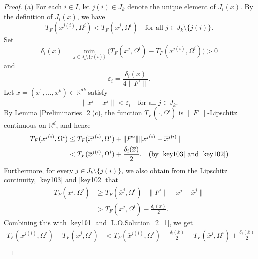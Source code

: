 \documentclass[sn-mathphys-num]{sn-jnl}%
\theoremstyle{definition}
\begin{document}
\begin{proof}
	(a) For each $i\in I$, let $j(i) \in J_k$ denote the unique element of $J_i(\overline{x})$. By the definition of $J_i(\overline{x})$, we have
	\begin{equation}\label{key101}
		T_F(\overline{x}^{j(i)},\Omega^i) < T_F(\overline{x}^j,\Omega^i) \quad \text{for all } j \in J_k\setminus\{j(i)\}.    
	\end{equation}
	Set
	\begin{equation*}
		\delta_i(\overline{x}) = \min_{j\in J_k \setminus \{j(i)\}} \bigl( T_F(\overline{x}^j,{\Omega^i}) - T_F(\overline{x}^{j(i)},\Omega^i) \bigr) > 0   
	\end{equation*}
	and
	\begin{equation}\label{key103}
		\varepsilon_i = \frac{\delta_i(\overline{x})}{4\|F^\circ\|}.
	\end{equation}
	Let $x=(x^1,\dots,x^k)\in \mathbb{R}^{dk}$ satisfy 
	\begin{equation}\label{key102}
		\|x^j-\overline{x}^j\|<\varepsilon_i\quad\text{for all }j \in J_k.
	\end{equation}
	By Lemma \ref{Preliminaries_2}(c), the function $T_F(\cdot,\Omega^i)$ is $\|F^\circ\|$-Lipschitz continuous on $\mathbb{R}^d$, and hence
	\begin{equation}
		\label{L.O.Solution_2_1}
		\begin{aligned}
			T_F(x^{j(i)},\Omega^i) &\le T_F(\overline{x}^{j(i)},\Omega^i) + \|F^\circ\|\|x^{j(i)}-\overline{x}^{j(i)}\|\\ &< T_F(\overline{x}^{j(i)},\Omega^i) + \frac{\delta_i(\overline{x})}{2}. \quad(\text{by \eqref{key103} and \eqref{key102}})
		\end{aligned}
	\end{equation}
	Furthermore, for every $j\in J_k\setminus\{j(i)\}$, we also obtain from the Lipschitz continuity, \eqref{key103} and \eqref{key102} that
	\begin{equation*}
		\label{L.O.Solution_2_2}
		\begin{aligned}
			T_F(x^j,\Omega^i) &\ge T_F(\overline{x}^j,{\Omega^i}) - \|F^\circ\|\|x^j-\overline{x}^j\|\\ &> T_F(\overline{x}^j,\Omega^i) - \frac{\delta_i(\overline{x})}{2}.
		\end{aligned}
	\end{equation*}
	Combining this with \eqref{key101} and \eqref{L.O.Solution_2_1}, we get
	\[
	\begin{aligned}
		T_F(x^{j(i)},\Omega^i)-T_F(x^j,\Omega^i)&<T_F(\overline{x}^{j(i)},\Omega^i)+\frac{\delta_i(\overline{x})}{2}-T_F(\overline{x}^j,\Omega^i) + \frac{\delta_i(\overline{x})}{2}\\

\end{aligned}\]
\end{proof}
\end{document}
